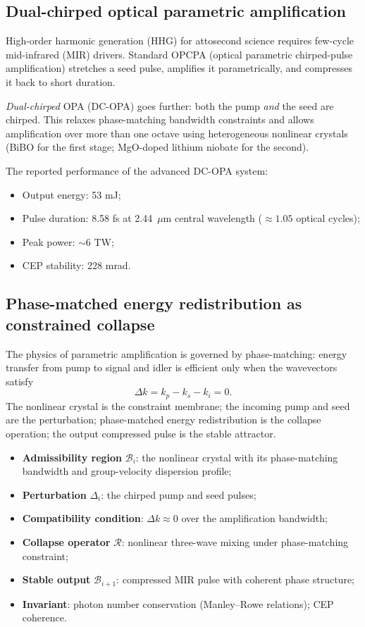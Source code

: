 \documentclass[12pt, a4paper]{article}
\theoremstyle{plain}
\theoremstyle{definition}
\theoremstyle{remark}
\newcommand{\Rcal}{\mathcal{R}}
\newcommand{\Bcal}{\mathcal{B}}
\begin{document}
\subsection{Dual-chirped optical parametric amplification}

High-order harmonic generation (HHG) for attosecond science requires
few-cycle mid-infrared (MIR) drivers.
Standard OPCPA (optical parametric chirped-pulse amplification)
stretches a seed pulse, amplifies it parametrically, and compresses
it back to short duration.

\emph{Dual-chirped} OPA (DC-OPA) goes further: both the pump
\emph{and} the seed are chirped.
This relaxes phase-matching bandwidth constraints and allows amplification
over more than one octave using heterogeneous nonlinear crystals
(BiBO for the first stage; MgO-doped lithium niobate for the second).

The reported performance of the advanced DC-OPA system:
\begin{itemize}
  \item Output energy: 53 mJ;
  \item Pulse duration: 8.58 fs at 2.44~$\mu$m central wavelength
        ($\approx 1.05$ optical cycles);
  \item Peak power: $\sim$6 TW;
  \item CEP stability: 228 mrad.
\end{itemize}

\subsection{Phase-matched energy redistribution as constrained collapse}

The physics of parametric amplification is governed by phase-matching:
energy transfer from pump to signal and idler is efficient only when
the wavevectors satisfy
\[
  \Delta k = k_p - k_s - k_i = 0.
\]
The nonlinear crystal is the constraint membrane;
the incoming pump and seed are the perturbation;
phase-matched energy redistribution is the collapse operation;
the output compressed pulse is the stable attractor.

\begin{itemize}
  \item \textbf{Admissibility region} $\Bcal_i$: the nonlinear crystal
        with its phase-matching bandwidth and group-velocity dispersion profile;
  \item \textbf{Perturbation} $\Delta_i$: the chirped pump and seed pulses;
  \item \textbf{Compatibility condition}: $\Delta k \approx 0$ over
        the amplification bandwidth;
  \item \textbf{Collapse operator} $\Rcal$: nonlinear three-wave mixing
        under phase-matching constraint;
  \item \textbf{Stable output} $\Bcal_{i+1}$: compressed MIR pulse
        with coherent phase structure;
  \item \textbf{Invariant}: photon number conservation (Manley--Rowe
        relations); CEP coherence.
\end{itemize}
\end{document}
